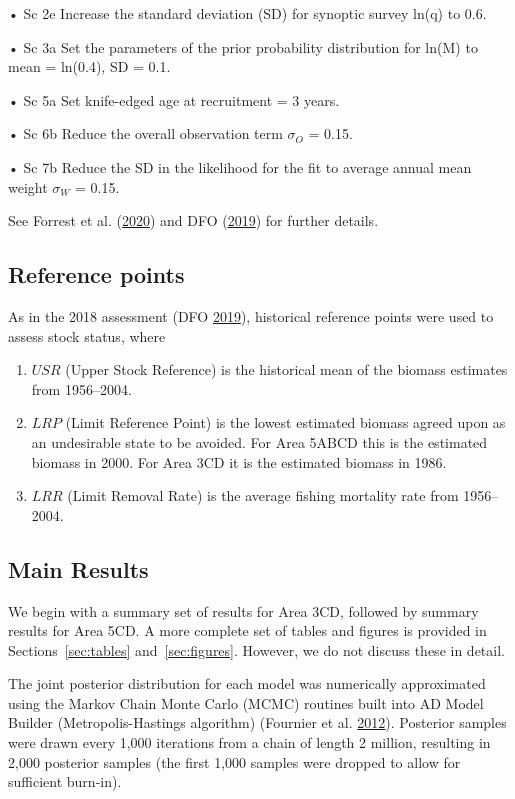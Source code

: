\documentclass[11pt]{book}
\begin{document}
• Sc 2e Increase the standard deviation (SD) for synoptic survey ln(q) to 0.6.

• Sc 3a Set the parameters of the prior probability distribution for ln(M) to mean = ln(0.4), SD = 0.1.

• Sc 5a Set knife-edged age at recruitment = 3 years.

• Sc 6b Reduce the overall observation term \(\sigma_O\) = 0.15.

• Sc 7b Reduce the SD in the likelihood for the fit to average annual mean weight \(\sigma_W\) = 0.15.

See Forrest et al. (\protect\hyperlink{ref-forrest2020}{2020}) and DFO (\protect\hyperlink{ref-dfo2019}{2019}) for further details.

\hypertarget{reference-points}{%
\subsection{Reference points}\label{reference-points}}

As in the 2018 assessment (DFO \protect\hyperlink{ref-dfo2019}{2019}), historical reference points were used to assess stock status, where
\begin{enumerate}
\def\labelenumi{\arabic{enumi}.}
\item
  \(USR\) (Upper Stock Reference) is the historical mean of the biomass estimates from 1956--2004.
\item
  \(LRP\) (Limit Reference Point) is the lowest estimated biomass agreed upon as an undesirable state to be avoided. For Area 5ABCD this is the estimated biomass in 2000. For Area 3CD it is the estimated biomass in 1986.
\item
  \(LRR\) (Limit Removal Rate) is the average fishing mortality rate from 1956--2004.
\end{enumerate}
\hypertarget{sec:summary-results}{%
\subsection{Main Results}\label{sec:summary-results}}

We begin with a summary set of results for Area 3CD, followed by summary results for Area 5CD. A more complete set of tables and figures is provided in Sections~\ref{sec:tables} and~\ref{sec:figures}. However, we do not discuss these in detail.

The joint posterior distribution for each model was numerically approximated using the Markov Chain Monte Carlo (MCMC) routines built into AD Model Builder (Metropolis-Hastings algorithm) (Fournier et al. \protect\hyperlink{ref-fournier2012}{2012}). Posterior samples were drawn every 1,000 iterations from a chain of length 2 million, resulting in 2,000 posterior samples (the first 1,000 samples were dropped to allow for sufficient burn-in).
\end{document}
